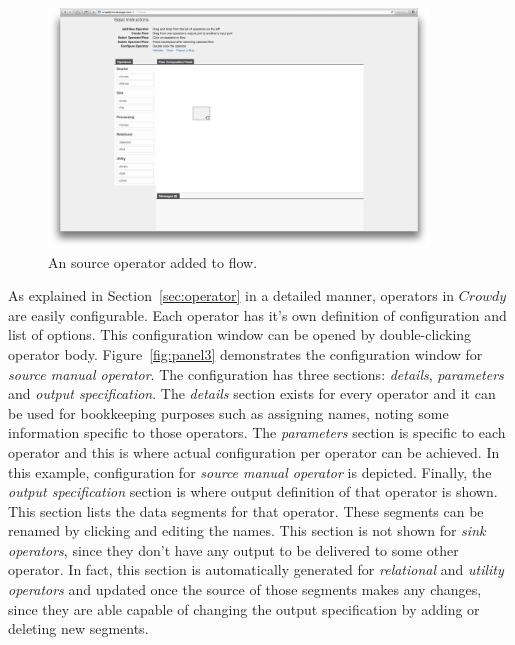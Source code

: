 \begin{figure}[ht]
	\centering
	\includegraphics[width=0.9\textwidth]{figures/tool/panel2.png}
	\caption{An source operator added to flow.}
	\label{fig:panel2}
\end{figure}

As explained in Section~\ref{sec:operator} in a detailed manner, operators in $Crowdy$ 
are easily configurable. Each operator has it's own definition of configuration and list 
of options. This configuration window can be opened by double-clicking operator body. 
Figure~\ref{fig:panel3} demonstrates the configuration window for
\textit{source manual operator}. The configuration has three sections: \textit{details}, 
\textit{parameters} and \textit{output specification}. The \textit{details} section exists for 
every operator and it can be used for bookkeeping purposes such as assigning 
names, noting some information specific to those operators. The \textit{parameters} 
section is specific to each operator and this is where actual configuration per operator 
can be achieved. In this example, configuration for \textit{source manual operator} 
is depicted. Finally, the \textit{output specification} section is where output definition 
of that operator is shown. This section lists the data segments for that operator. These 
segments can be renamed by clicking and editing the names. This section is 
not shown for \textit{sink operators}, since they don't have any output to be delivered 
to some other operator. In fact, this section is automatically generated for 
\textit{relational} and \textit{utility operators} and updated once the source of those 
segments makes any changes, since they are able capable of changing the 
output specification by adding or deleting new segments.

